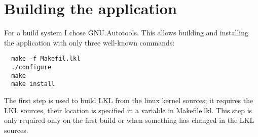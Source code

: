 \chapter{Building the application}


For a build system I chose GNU Autotools. This allows building
and installing the application with only three well-known commands:

\lstset{language=bash,caption=Build System}
\begin{lstlisting}
  make -f Makefil.lkl
  ./configure
  make
  make install
\end{lstlisting}

The first step is used to build LKL from the linux kernel sources; it
requires the LKL sources, their location is specified in a variable in
Makefile.lkl. This step is only required only on the first build or
when something has changed in the LKL sources.
